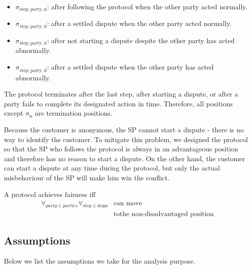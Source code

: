 \documentclass[pdftex,twocolumn,epjc3]{svjour3}
\begin{document}
{\begin{itemize}

\item
  $\mathrm{\sigma_{step,party,n}}$: after following the protocol when the other party acted normally.
\item
  $\mathrm{\sigma_{step,party,d}}$: after a settled dispute when the other party acted normally.
\item
  $\mathrm{\sigma_{step,party,\overline{n}}}$: after not starting a dispute despite the other party has acted abnormally.
\item
  $\mathrm{\sigma_{step,party,\overline{d}}}$: after a settled dispute when the other party has acted abnormally.
\end{itemize}



The protocol terminates after the last step, after starting a dispute, or after a party fails to complete its designated action in time. Therefore, all positions except $\mathrm{\sigma_n}$ are termination positions.

Because the customer is anonymous, the SP cannot start a dispute - there is no way to identify the customer. To mitigate this problem, we designed the protocol so that the SP who follows the protocol is always in an advantageous position and therefore has no reason to start a dispute. On the other hand, the customer can start a dispute at any time during the protocol, but only the actual misbehaviour of the SP will make him win the conflict.

\begin{definition}[Fairness] \label{def:fairness}
A protocol achieves fairness iff 
\begin{equation*}
\begin{split}
\forall_{party \in parties}\forall_{\mathrm{step} \in \mathrm{steps}} &\operatorname{can\ move}\\
&\operatorname{to the\ non-disadvantaged\ position} 
\end{split}
\end{equation*}

\end{definition}


\subsection{Assumptions}\label{sec:assumptions}

Below we list the assumptions we take for the analysis purpose.  

}
\end{document}
